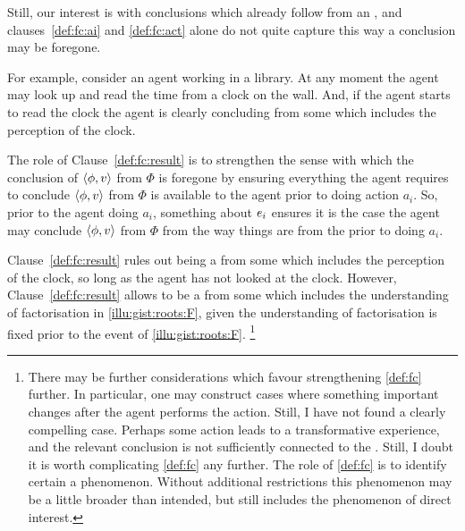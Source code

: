 \begin{note}
  Still, our interest is with conclusions which already follow from an \agpe{}, and clauses~\ref{def:fc:ai} and \ref{def:fc:act} alone do not quite capture this way a conclusion may be foregone.

  For example, consider an agent working in a library.
  At any moment the agent may look up and read the time from a clock on the wall.
  And, if the agent starts to read the clock the agent is clearly concluding  from some \pool{} which includes the \agents{} perception of the clock.

  The role of Clause~\ref{def:fc:result} is to strengthen the sense with which the conclusion of \(\langle\phi, v\rangle\) from \(\Phi\) is foregone by ensuring everything the agent requires to conclude \(\langle\phi, v\rangle\) from \(\Phi\) is available to the agent prior to doing action \(a_{i}\).
  So, prior to the agent doing \(a_{i}\), something about \(e\sb{i}\) ensures it is the case the agent may conclude \(\langle\phi, v\rangle\) from \(\Phi\) from the way things are from the \agpe{} prior to doing \(a_{i}\).

  Clause~\ref{def:fc:result} rules out  being a \fc{} from some \pool{} which includes the \agents{} perception of the clock, so long as the agent has not looked at the clock.
  However, Clause~\ref{def:fc:result} allows  to be a \fc{} from some \pool{} which includes the \agents{} understanding of factorisation in \autoref{illu:gist:roots:F}, given the \agents{} understanding of factorisation is fixed prior to the event of \autoref{illu:gist:roots:F}.%
  \footnote{
    There may be further considerations which favour strengthening \autoref{def:fc} further.
    In particular, one may construct cases where something important changes after the agent performs the action.
    Still, I have not found a clearly compelling case.
    Perhaps some action leads to a transformative experience, and the relevant conclusion is not sufficiently connected to the .
    Still, I doubt it is worth complicating \autoref{def:fc} any further.
    The role of \autoref{def:fc} is to identify certain a phenomenon.
    Without additional restrictions this phenomenon may be a little broader than intended, but still includes the phenomenon of direct interest.
  }
\end{note}

